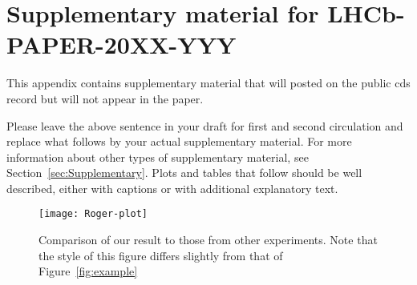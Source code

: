 \clearpage

\section{Supplementary material for LHCb-PAPER-20XX-YYY}
\label{sec:Supplementary-App}

This appendix contains supplementary material that will posted
on the public cds record but will not appear in the paper.

Please leave the above sentence in your draft for first and 
second circulation and replace what follows by your actual supplementary material.
For more information about other types of supplementary material, see Section~\ref{sec:Supplementary}. Plots and tables that follow should be well described, either with captions or with additional explanatory text.


\begin{figure}[!htb]
  \begin{center}
    \texttt{[image: Roger-plot]}
    \vspace*{-1.0cm}
  \end{center}
  \caption{
    \small %
    Comparison of our result to those from other experiments.
    Note that the style of this figure differs slightly from that of Figure~\ref{fig:example}}
  \label{fig:roger}
\end{figure}

\clearpage
